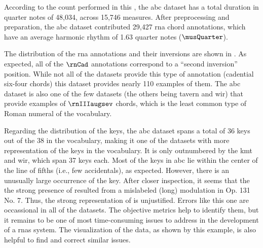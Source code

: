 
According to the count performed in this \thesisdiss{}, the
\gls{abc} dataset has a total duration in quarter notes of
48,034, across 15,746 measures. After preprocessing and
preparation, the \gls{abc} dataset contributed 29,427
\gls{rna} chord annotations, which have an average harmonic
rhythm of 1.63 quarter notes ($\musQuarter$).

The distribution of the \gls{rna} annotations and their
inversions are shown in . As
expected, all of the $\rnCad$ annotations correspond to a
``second inversion'' position. While not all of the datasets
provide this type of annotation (cadential six-four chords)
this dataset provides nearly 110 examples of them. The
\gls{abc} dataset is also one of the few datasets (the
others being \gls{tavern} and \gls{wir}) that provide
examples of $\rnIIIaugsev$ chords, which is the least common
type of Roman numeral of the vocabulary.


Regarding the distribution of the keys, the \gls{abc}
dataset spans a total of 36 keys out of the 38 in the
vocabulary, making it one of the datasets with more
representation of the keys in the vocabulary. It is only
outnumbered by the \gls{kmt} and \gls{wir}, which span 37
keys each. Most of the keys in \gls{abc} lie within the
center of the line of fifths (i.e., few accidentals), as
expected. However, there is an unusually large occurrence of
the \keyDs{} key. After closer inspection, it seems that the
the strong presence of \keyDs{} resulted from a mislabeled
(long) modulation in Op. 131 No. 7. Thus, the strong
representation of \keyDs{} is unjustified. Errors like this
one are occassional in all of the datasets. The objective
metrics help to identify them, but it remains to be one of
most time-consuming issues to address in the development of
a \glspl{rna} system. The visualization of the data, as
shown by this example, is also helpful to find and correct
similar issues.


